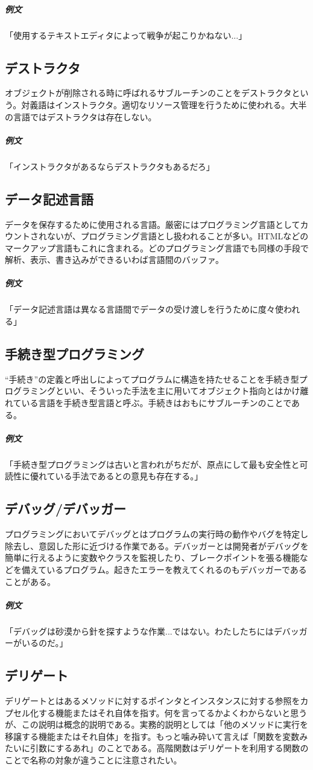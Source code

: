 \documentclass[dvipdfmx,jb5]{jreport}
\begin{document}
\subparagraph{例文}「使用するテキストエディタによって戦争が起こりかねない...」

\subsection{デストラクタ}
オブジェクトが削除される時に呼ばれるサブルーチンのことをデストラクタという。対義語はインストラクタ。適切なリソース管理を行うために使われる。大半の言語ではデストラクタは存在しない。

\subparagraph{例文}「インストラクタがあるならデストラクタもあるだろ」

\subsection{データ記述言語}
データを保存するために使用される言語。厳密にはプログラミング言語としてカウントされないが、プログラミング言語とし扱われることが多い。HTMLなどのマークアップ言語もこれに含まれる。どのプログラミング言語でも同様の手段で解析、表示、書き込みができるいわば言語間のバッファ。

\subparagraph{例文}「データ記述言語は異なる言語間でデータの受け渡しを行うために度々使われる」

\subsection{手続き型プログラミング}
``手続き''の定義と呼出しによってプログラムに構造を持たせることを手続き型プログラミングといい、そういった手法を主に用いてオブジェクト指向とはかけ離れている言語を手続き型言語と呼ぶ。手続きはおもにサブルーチンのことである。

\subparagraph{例文}「手続き型プログラミングは古いと言われがちだが、原点にして最も安全性と可読性に優れている手法であるとの意見も存在する。」

\subsection{デバッグ/デバッガー}
プログラミングにおいてデバッグとはプログラムの実行時の動作やバグを特定し除去し、意図した形に近づける作業である。デバッガーとは開発者がデバッグを簡単に行えるように変数やクラスを監視したり、ブレークポイントを張る機能などを備えているプログラム。起きたエラーを教えてくれるのもデバッガーであることがある。

\subparagraph{例文}「デバッグは砂漠から針を探すような作業...ではない。わたしたちにはデバッガーがいるのだ。」

\subsection{デリゲート}
デリゲートとはあるメソッドに対するポインタとインスタンスに対する参照をカプセル化する機能またはそれ自体を指す。何を言ってるかよくわからないと思うが、この説明は概念的説明である。実務的説明としては「他のメソッドに実行を移譲する機能またはそれ自体」を指す。もっと噛み砕いて言えば「関数を変数みたいに引数にするあれ」のことである。高階関数はデリゲートを利用する関数のことで名称の対象が違うことに注意されたい。
\end{document}
